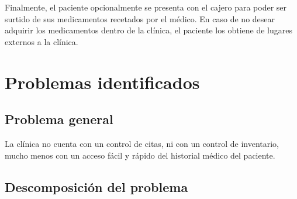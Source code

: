 Finalmente, el paciente opcionalmente se presenta con el cajero para poder ser surtido de sus medicamentos recetados por el médico. En caso de no desear adquirir los medicamentos dentro de la clínica, el paciente los obtiene de lugares externos a la clínica.

\section{Problemas identificados}

\subsection{Problema general}

La clínica no cuenta con un control de citas, ni con un control de inventario, mucho menos con un acceso fácil y rápido del historial médico del paciente.

\subsection{Descomposición del problema}

